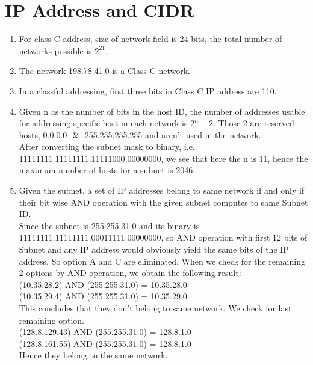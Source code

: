 \documentclass[12pt]{article}
\begin{document}
\maketitle

\section{IP Address and CIDR}
\begin{enumerate}
    \item For class C address, size of network field is 24 bits, the total number of networks possible is $2^{21}$.
    
    \item The network 198.78.41.0 is a Class C network.
    
    \item In a classful addressing, first three bits in Class C IP address are  110.
    
    \item Given n as the number of bits in the host ID, the number of addresses usable for addressing specific host in each network is $2^{n}-2$. Those 2 are reserved hosts, 0.0.0.0 $\And$ 255.255.255.255 and aren't used in the network. \\
    After converting the subnet mask to binary, i.e. 11111111.11111111.11111000.00000000, we see that here the n is 11, hence the maximum number of hosts for a subnet is 2046.
    
    \item Given the subnet, a set of IP addresses belong to same network if and only if their bit wise AND operation with the given subnet computes to same Subnet ID. \\
    Since the subnet is 255.255.31.0 and its binary is 11111111.11111111.00011111.00000000, so AND operation with first 12 bits of Subnet and any IP address would obviously yield the same bits of the IP address. So option A and C are eliminated.
    When we check for the remaining 2 options by AND operation, we obtain the following result: \\
    (10.35.28.2) AND (255.255.31.0) = 10.35.28.0 \\ 
    (10.35.29.4) AND (255.255.31.0) = 10.35.29.0 \\
    This concludes that they don't belong to same network. We check for last remaining option. \\
    (128.8.129.43) AND (255.255.31.0) = 128.8.1.0 \\
    (128.8.161.55) AND (255.255.31.0) = 128.8.1.0 \\
    Hence they belong to the same network.
    

\end{enumerate}
\end{document}
